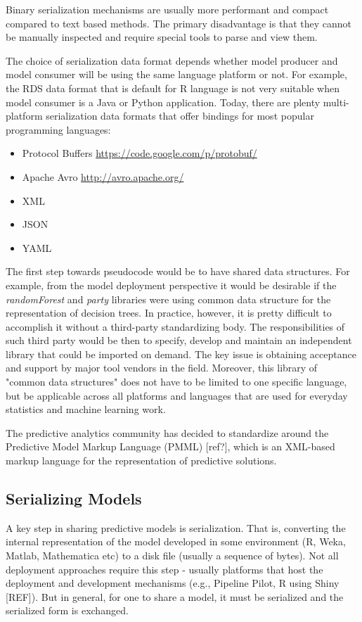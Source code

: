 \documentclass[12pt,letterpaper]{article}
\begin{document}
Binary serialization mechanisms are usually more performant and 
compact compared to text based methods. The primary disadvantage is
that they cannot be manually inspected and require special tools to
parse and view them.

The choice of serialization data format depends whether model producer 
and model consumer will be using the same language platform or not. For
example, the RDS data format that is default for R language is not very
suitable when model consumer is a Java or Python application. Today,
there are plenty multi-platform serialization data formats that offer
bindings for most popular programming languages:
\begin{itemize}
  \item Protocol Buffers \url{https://code.google.com/p/protobuf/}
  \item Apache Avro \url{http://avro.apache.org/}
  \item XML
  \item JSON
  \item YAML
\end{itemize}

The first step towards pseudocode would be to have shared data structures.
For example, from the model deployment perspective it would be desirable
if the \textit{randomForest} and \textit{party} libraries were using common
data structure for the representation of decision trees. In practice,
however, it is pretty difficult to accomplish it without a third-party 
standardizing body. The responsibilities of such third party would be 
then to specify, develop and maintain an independent library that could
be imported on demand. The key issue is obtaining acceptance and support
by major tool vendors in the field. Moreover, this library of "common 
data structures" does not have to be limited to one specific language, but
be applicable across all platforms and languages that are used for
everyday statistics and machine learning work.

The predictive analytics community has decided to standardize around
the Predictive Model Markup Language (PMML) [ref?], which is an XML-based
markup language for the representation of predictive solutions. 

\subsection{Serializing Models}
\label{sec:serializing-models}

A key step in sharing predictive models is serialization. That is,
converting the internal representation of the model developed in some
environment (R, Weka, Matlab, Mathematica etc) to a disk file (usually
a sequence of bytes). Not all deployment approaches require this step
- usually platforms that host the deployment and development
mechanisms (e.g., Pipeline Pilot, R using Shiny [REF]). But in general, for one to share a
model, it must be serialized and the serialized form is exchanged.
\end{document}
